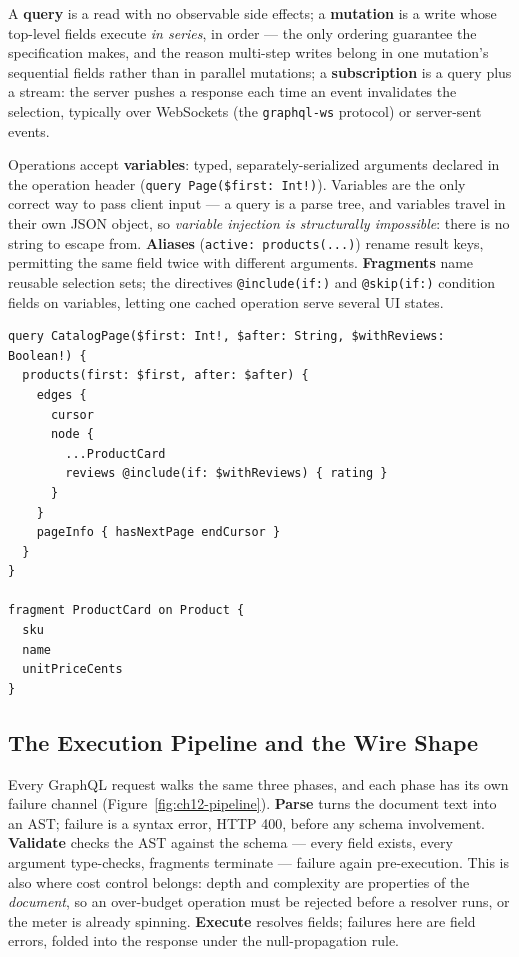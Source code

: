 A \textbf{query} is a read with no observable side effects; a
\textbf{mutation} is a write whose top-level fields execute \emph{in
series}, in order --- the only ordering guarantee the specification makes,
and the reason multi-step writes belong in one mutation's sequential
fields rather than in parallel mutations; a \textbf{subscription} is a
query plus a stream: the server pushes a response each time an event
invalidates the selection, typically over WebSockets (the
\texttt{graphql-ws} protocol) or server-sent events.

Operations accept \textbf{variables}: typed, separately-serialized
arguments declared in the operation header (\texttt{query Page(\$first:
Int!)}). Variables are the only correct way to pass client input --- a
query is a parse tree, and variables travel in their own JSON object, so
\emph{variable injection is structurally impossible}: there is no string
to escape from. \textbf{Aliases} (\texttt{active: products(...)}) rename
result keys, permitting the same field twice with different arguments.
\textbf{Fragments} name reusable selection sets; the directives
\texttt{@include(if:)} and \texttt{@skip(if:)} condition fields on
variables, letting one cached operation serve several UI states.

\begin{verbatim}
query CatalogPage($first: Int!, $after: String, $withReviews: Boolean!) {
  products(first: $first, after: $after) {
    edges {
      cursor
      node {
        ...ProductCard
        reviews @include(if: $withReviews) { rating }
      }
    }
    pageInfo { hasNextPage endCursor }
  }
}

fragment ProductCard on Product {
  sku
  name
  unitPriceCents
}
\end{verbatim}

\subsection{The Execution Pipeline and the Wire Shape}
\label{sec:ch12-pipeline}

Every GraphQL request walks the same three phases, and each phase has its
own failure channel (Figure~\ref{fig:ch12-pipeline}). \textbf{Parse} turns
the document text into an AST; failure is a syntax error, HTTP 400, before
any schema involvement. \textbf{Validate} checks the AST against the schema
--- every field exists, every argument type-checks, fragments terminate ---
failure again pre-execution. This is also where cost control belongs:
depth and complexity are properties of the \emph{document}, so an
over-budget operation must be rejected before a resolver runs, or the
meter is already spinning. \textbf{Execute} resolves fields; failures here
are field errors, folded into the response under the null-propagation rule.

